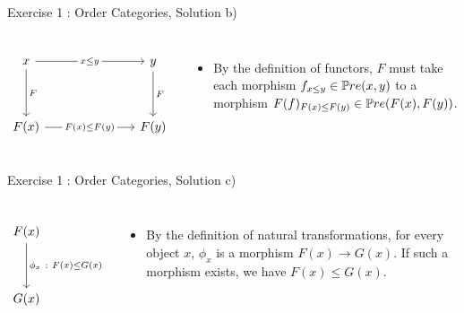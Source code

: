 \begin{frame}[fragile]{Exercise 1 : Order Categories, Solution b)}
	\begin{columns}
		\[\begin{tikzcd}
			x &&& y \\
			\\
			{F(x)} &&& {F(y)}
			\arrow["{{x \leq y}}"{description}, from=1-1, to=1-4]
			\arrow["F", from=1-1, to=3-1]
			\arrow["F", from=1-4, to=3-4]
			\arrow["{{F(x) \leq F(y)}}"{description}, from=3-1, to=3-4]
		\end{tikzcd}\]
		\begin{itemize}
			\item By the definition of functors, $F$ must take each morphism $f_{x \leq y} \in \mathbb{P}re(x,y)$ to a morphism $F(f)_{F(x) \leq F(y)} \in \mathbb{P}re(F(x),F(y))$.
		\end{itemize} 
	\end{columns} 
\end{frame}
\begin{frame}[fragile]{Exercise 1 : Order Categories, Solution c)}
	\begin{columns}
		\column{0.3\textwidth}
		\[\begin{tikzcd}
			F(x)\\
			\\
			{G(x)}
			\arrow["\phi_x\ :\ F(x) \leq G(x)", from=1-1, to=3-1]
		\end{tikzcd}\]
		\column{0.7\textwidth}
		\begin{itemize}
			\item By the definition of natural transformations, for every object $x$, $\phi_x$ is a morphism $F(x) \to G(x)$. If such a morphism exists, we have $F(x) \leq G(x)$.
		\end{itemize} 
	\end{columns} 
\end{frame}